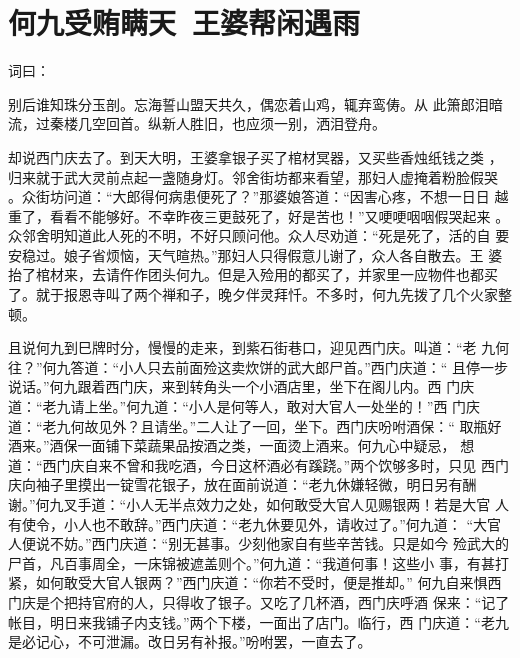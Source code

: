 \chapter{何九受贿瞒天~王婆帮闲遇雨}

词曰：

别后谁知珠分玉剖。忘海誓山盟天共久，偶恋着山鸡，辄弃鸾俦。从
此箫郎泪暗流，过秦楼几空回首。纵新人胜旧，也应须一别，洒泪登舟。

却说西门庆去了。到天大明，王婆拿银子买了棺材冥器，又买些香烛纸钱之类
，归来就于武大灵前点起一盏随身灯。邻舍街坊都来看望，那妇人虚掩着粉脸假哭
。众街坊问道：“大郎得何病患便死了？”那婆娘答道：“因害心疼，不想一日日
越重了，看看不能够好。不幸昨夜三更鼓死了，好是苦也！”又哽哽咽咽假哭起来
。众邻舍明知道此人死的不明，不好只顾问他。众人尽劝道：“死是死了，活的自
要安稳过。娘子省烦恼，天气暄热。”那妇人只得假意儿谢了，众人各自散去。王
婆抬了棺材来，去请仵作团头何九。但是入殓用的都买了，并家里一应物件也都买
了。就于报恩寺叫了两个禅和子，晚夕伴灵拜忏。不多时，何九先拨了几个火家整
顿。

且说何九到巳牌时分，慢慢的走来，到紫石街巷口，迎见西门庆。叫道：“老
九何往？”何九答道：“小人只去前面殓这卖炊饼的武大郎尸首。”西门庆道：“
且停一步说话。”何九跟着西门庆，来到转角头一个小酒店里，坐下在阁儿内。西
门庆道：“老九请上坐。”何九道：“小人是何等人，敢对大官人一处坐的！”西
门庆道：“老九何故见外？且请坐。”二人让了一回，坐下。西门庆吩咐酒保：“
取瓶好酒来。”酒保一面铺下菜蔬果品按酒之类，一面烫上酒来。何九心中疑忌，
想道：“西门庆自来不曾和我吃酒，今日这杯酒必有蹊跷。”两个饮够多时，只见
西门庆向袖子里摸出一锭雪花银子，放在面前说道：“老九休嫌轻微，明日另有酬
谢。”何九叉手道：“小人无半点效力之处，如何敢受大官人见赐银两！若是大官
人有使令，小人也不敢辞。”西门庆道：“老九休要见外，请收过了。”何九道：
“大官人便说不妨。”西门庆道：“别无甚事。少刻他家自有些辛苦钱。只是如今
殓武大的尸首，凡百事周全，一床锦被遮盖则个。”何九道：“我道何事！这些小
事，有甚打紧，如何敢受大官人银两？”西门庆道：“你若不受时，便是推却。”
何九自来惧西门庆是个把持官府的人，只得收了银子。又吃了几杯酒，西门庆呼酒
保来：“记了帐目，明日来我铺子内支钱。”两个下楼，一面出了店门。临行，西
门庆道：“老九是必记心，不可泄漏。改日另有补报。”吩咐罢，一直去了。

